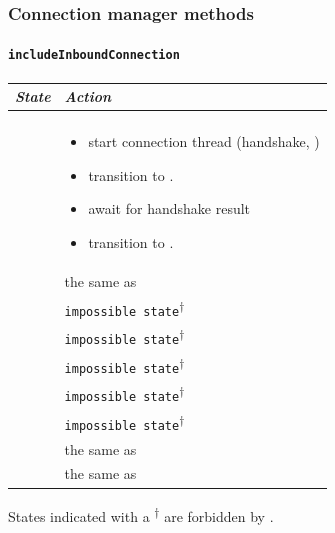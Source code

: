 \subsubsection{Connection manager methods}

\paragraph{\texttt{includeInboundConnection}}
\begin{center}
  \begin{tabular}[h]{ll}
    \textit{State}           & \textit{Action} \\\hline\\[2pt]
    \InitialState{}          &
      \begin{minipage}[t]{8cm}
        \begin{itemize}
          \item start connection thread (handshake, \mux{})
          \item transition to \UnnegotiatedStateIn{}.
          \item await for handshake result
          \item transition to \InboundIdleStateAny{}.
        \end{itemize}
      \end{minipage}
      \vspace{8pt}\\
    \ReservedOutboundState{} & the same as \InitialState{} \\[8pt]
    \UnnegotiatedStateAny{}  & \texttt{impossible state}\textsuperscript{$\dagger$} \\[8pt]
    \InboundIdleStateAny{}   & \texttt{impossible state}\textsuperscript{$\dagger$} \\[8pt]
    \InboundStateAny{}       & \texttt{impossible state}\textsuperscript{$\dagger$} \\[8pt]
    \OutboundStateAny{}      & \texttt{impossible state}\textsuperscript{$\dagger$} \\[8pt]
    \DuplexState{}           & \texttt{impossible state}\textsuperscript{$\dagger$} \\[8pt]
    \TerminatingState{}      & the same as \InitialState{} \\[8pt]
    \TerminatedState{}       & the same as \InitialState{} \\[8pt]
  \end{tabular}
\end{center}
States indicated with a \textsuperscript{$\dagger$} are forbidden by \TCP{}.


